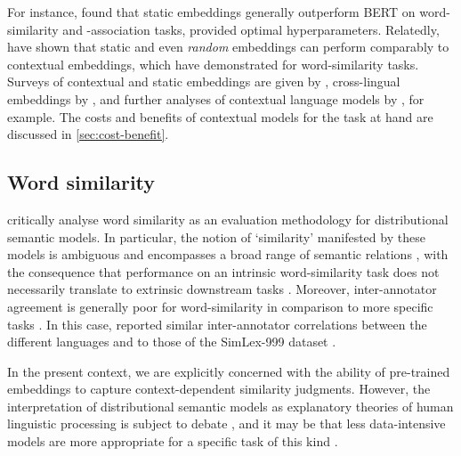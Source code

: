 For instance, \textcites{Lenci2022} found that static embeddings generally outperform
BERT \parencites{Devlin2019} on word-similarity and -association tasks, provided
optimal hyperparameters.
Relatedly, \textcites{Arora2020} have shown that static and even \emph{random}
embeddings can perform comparably to contextual embeddings, which
\textcites[5244-5246]{Gupta2019}[4760-4762]{Bommasani2020} have demonstrated for
word-similarity tasks.
Surveys of contextual and static embeddings are given by
\textcites{Liu2020}{Torregrossa2021}, cross-lingual embeddings by
\textcites{Ruder2019}, and further analyses of contextual language models by
\textcites{Reif2019}{Brunner2019}, for example.
The costs and benefits of contextual models for the task at hand are discussed in
\cref{sec:cost-benefit}.

\subsection{Word similarity}

\textcites{Batchkarov2016} critically analyse word similarity as an evaluation
methodology for distributional semantic models.
In particular, the notion of `similarity' manifested by these models is ambiguous
\parencites{Elekes2020} and encompasses a broad range of semantic relations
\parencites[2]{Pado2003}, with the consequence that performance on an intrinsic
word-similarity task does not necessarily translate to extrinsic downstream tasks
\parencites[7-8]{Batchkarov2016}.
Moreover, inter-annotator agreement is generally poor for word-similarity in comparison
to more specific tasks \parencites[8-9]{Batchkarov2016}.
In this case, \textcites[8]{Armendariz2020}[42]{Armendariz2020a} reported similar
inter-annotator correlations between the different languages and to those of the
SimLex-999 dataset \parencites[678-680]{Hill2015}.

In the present context, we are explicitly concerned with the ability of pre-trained
embeddings to capture context-dependent similarity judgments.
However, the interpretation of distributional semantic models as explanatory theories
of human linguistic processing is subject to debate
\parencites{Gunther2019}{Westera2019}, and it may be that less data-intensive models
are more appropriate for a specific task of this kind \parencites{DeDeyne2016}.
